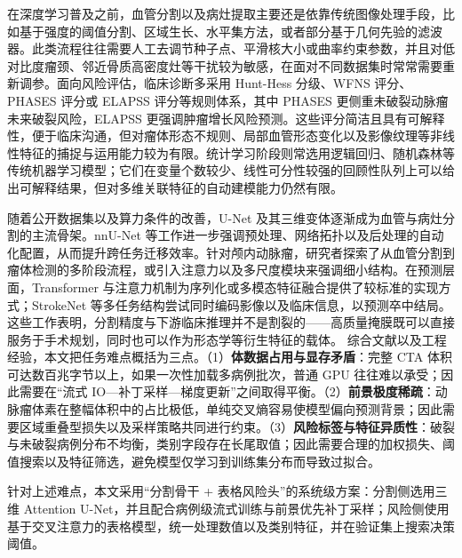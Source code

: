在深度学习普及之前，血管分割以及病灶提取主要还是依靠传统图像处理手段，比如基于强度的阈值分割、区域生长、水平集方法，或者部分基于几何先验的滤波器。此类流程往往需要人工去调节种子点、平滑核大小或曲率约束参数，并且对低对比度瘤颈、邻近骨质高密度灶等干扰较为敏感，在面对不同数据集时常常需要重新调参。面向风险评估，临床诊断多采用 Hunt-Hess 分级、WFNS 评分、PHASES 评分或 ELAPSS 评分等规则体系，其中 PHASES 更侧重未破裂动脉瘤未来破裂风险，ELAPSS 更强调肿瘤增长风险预测\cite{greving2014,backes2017}。这些评分简洁且具有可解释性，便于临床沟通，但对瘤体形态不规则、局部血管形态变化以及影像纹理等非线性特征的捕捉与运用能力较为有限。统计学习阶段则常选用逻辑回归、随机森林等传统机器学习模型；它们在变量个数较少、线性可分性较强的回顾性队列上可以给出可解释结果，但对多维关联特征的自动建模能力仍然有限。

随着公开数据集以及算力条件的改善，U-Net 及其三维变体逐渐成为血管与病灶分割的主流骨架\cite{unet,unet3d}。nnU-Net 等工作进一步强调预处理、网络拓扑以及后处理的自动化配置，从而提升跨任务迁移效率\cite{nnunet}。针对颅内动脉瘤，研究者探索了从血管分割到瘤体检测的多阶段流程，或引入注意力以及多尺度模块来强调细小结构\cite{chen2021,ou2022}。在预测层面，Transformer 与注意力机制为序列化或多模态特征融合提供了较标准的实现方式\cite{vaswani2017}；StrokeNet 等多任务结构尝试同时编码影像以及临床信息，以预测卒中结局\cite{strokenet}。这些工作表明，分割精度与下游临床推理并不是割裂的——高质量掩膜既可以直接服务于手术规划，同时也可以作为形态学等衍生特征的载体。
综合文献以及工程经验，本文把任务难点概括为三点。（1）\textbf{体数据占用与显存矛盾}：完整 CTA 体积可达数百兆字节以上，如果一次性加载多病例批次，普通 GPU 往往难以承受；因此需要在“流式 IO—补丁采样—梯度更新”之间取得平衡。（2）\textbf{前景极度稀疏}：动脉瘤体素在整幅体积中的占比极低，单纯交叉熵容易使模型偏向预测背景；因此需要区域重叠型损失以及采样策略共同进行约束。（3）\textbf{风险标签与特征异质性}：破裂与未破裂病例分布不均衡，类别字段存在长尾取值；因此需要合理的加权损失、阈值搜索以及特征筛选，避免模型仅学习到训练集分布而导致过拟合。

针对上述难点，本文采用“分割骨干 + 表格风险头”的系统级方案：分割侧选用三维 Attention U-Net，并且配合病例级流式训练与前景优先补丁采样；风险侧使用基于交叉注意力的表格模型，统一处理数值以及类别特征，并在验证集上搜索决策阈值。

